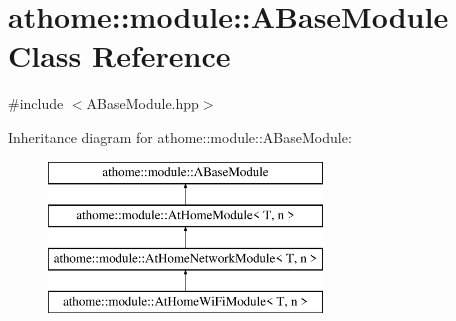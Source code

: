 \hypertarget{classathome_1_1module_1_1_a_base_module}{}\section{athome\+:\+:module\+:\+:A\+Base\+Module Class Reference}
\label{classathome_1_1module_1_1_a_base_module}


{\ttfamily \#include $<$A\+Base\+Module.\+hpp$>$}

Inheritance diagram for athome\+:\+:module\+:\+:A\+Base\+Module\+:\begin{figure}[H]
\begin{center}
\leavevmode
\includegraphics[height=4.000000cm]{classathome_1_1module_1_1_a_base_module}
\end{center}
\end{figure}
